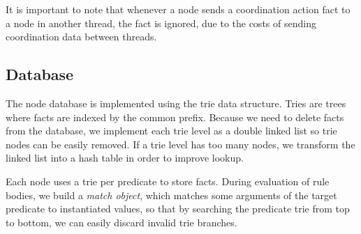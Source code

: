 It is important to note that whenever a node sends a coordination action fact to a node in another thread, the fact is ignored, due to the costs of sending
coordination data between threads.

\subsection{Database}

The node database is implemented using the trie data structure. Tries are trees where facts are indexed
by the common prefix. Because we need to delete facts from the database, we implement each trie level
as a double linked list so trie nodes can be easily removed. If a trie level has too many nodes, we
transform the linked list into a hash table in order to improve lookup.

Each node uses a trie per predicate to store facts. During evaluation of rule bodies, we build a
\emph{match object}, which matches some arguments of the target predicate to instantiated values, so
that by searching the predicate trie from top to bottom, we can easily discard invalid trie branches.

\begin{comment}
\subsection{Memory Allocator}

Memory allocation is done using pools of memory objects local to each thread. This reduces contention in
memory allocation.
\end{comment}